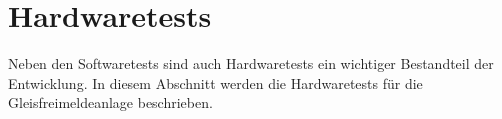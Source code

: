 \section{Hardwaretests}\label{text:Entwicklung-der-GFA:Hardwaretests}

Neben den Softwaretests sind auch Hardwaretests ein wichtiger Bestandteil der Entwicklung. In diesem Abschnitt werden die Hardwaretests für die Gleisfreimeldeanlage beschrieben.